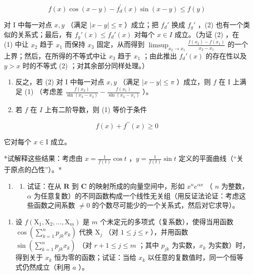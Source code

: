\[
f (x) \cos (x - y) - f _ {d} ^ {\prime} (x) \sin (x - y) \leqslant f (y)\tag{2}
\]

对 I 中每一对点 \(x, y\) （满足 \(|x - y| \leqslant \pi\) ）成立；把 \(f_d'\) 换成 \(f_g'\) ，(2) 也有一个类似的关系式；最后，有 \(f_g'(x) \leqslant f_d'(x)\) 对每个 \(x \in I\) 成立。（为证 (2) ，在 (1) 中让 \(x_2\) 趋于 \(x_1\) 而保持 \(x_3\) 固定，从而得到 \(\limsup_{x_2 \to x_1} \frac{f(x_2) - f(x_1)}{x_2 - x_1}\) 的一个上界；然后，在所得的不等式中让 \(x_3\) 趋于 \(x_1\) ；由此推出 \(f_d'(x)\) 的存在性以及 \(y > x\) 时的不等式 (2) ；对其余部分同样处理。）

\begin{enumerate}
\def\labelenumi{\alph{enumi})}
\setcounter{enumi}{1}
\item
  反之，若 (2) 对 I 中每一对点 \(x, y\) （满足 \(|x - y| \leqslant \pi\) ）成立，则 \(f\) 在 I 上满足 (1) （考虑差 \(\frac{f(x_2)}{\sin(x_3 - x_2)} - \frac{f(x_1)}{\sin(x_3 - x_1)}\) ）。
\item
  若 \(f\) 在 \(I\) 上有二阶导数，则 (1) 等价于条件
\end{enumerate}

\[
f (x) + f ^ {\prime \prime} (x) \geqslant 0\tag{3}
\]

它对每个 \(x\in \mathrm{I}\) 成立。

*试解释这些结果：考虑由 \(x = \frac{1}{f(t)} \cos t\) ，\(y = \frac{1}{f(t)} \sin t\) 定义的平面曲线（“关于原点的凸性”）。*

\begin{enumerate}
\def\labelenumi{\arabic{enumi})}
\setcounter{enumi}{17}
\tightlist
\item
  \begin{enumerate}
  \def\labelenumii{\alph{enumii})}
  \tightlist
  \item
    试证：在从 \(\mathbf{R}\) 到 \(\mathbf{C}\) 的映射所成的向量空间中，形如 \(x^n e^{\alpha x}\) （ \(n\) 为整数，\(\alpha\) 为任意复数）的不同函数构成一个线性无关组（用反证法论证：考虑这些函数之间系数 \(\neq 0\) 的个数尽可能少的一个关系式，然后对它求导）。
  \end{enumerate}
\end{enumerate}

\begin{enumerate}
\def\labelenumi{\alph{enumi})}
\setcounter{enumi}{1}
\tightlist
\item
  设 \(f(\mathrm{X}_1, \mathrm{X}_2, \ldots, \mathrm{X}_m)\) 是 \(m\) 个未定元的多项式（复系数），使得当用函数 \(\cos\left(\sum_{k=1}^{n} p_{jk} x_k\right)\) 代换 \(\mathrm{X}_j\) （对 \(1 \leqslant j \leqslant r\) ），并用函数 \(\sin\left(\sum_{k=1}^{n} p_{jk} x_k\right)\) （对 \(r + 1 \leqslant j \leqslant m\) ；其中 \(p_{jk}\) 为实数，\(x_k\) 为实数）时，得到关于 \(x_k\) 恒为零的函数；试证：当给 \(x_k\) 以任意的复数值时，同一个恒等式仍然成立（利用 \(a\) ）。
\end{enumerate}

